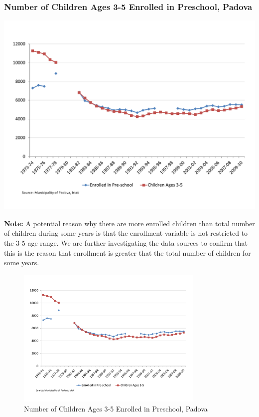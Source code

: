 \documentclass[static]{JJH-Beamer_PAGENOS}
\begin{document}
\begin{frame}
\frametitle{Number of Children Ages 3-5 Enrolled in Preschool, Padova}
\begin{center}
\includegraphics[scale=0.36]{../../output/image/Enrollement_Preschool_Padova.pdf}
\end{center}
\tiny{\textbf{Note:} A potential reason why there are more enrolled children than total number of children during some years is that the enrollment variable is not restricted to the 3-5 age range. We are further investigating the data sources to confirm that this is the reason that enrollment is greater that the total number of children for some years.}
 
\centering
\begin{figure}[H]
\caption{Number of Children Ages 3-5 Enrolled in Preschool, Padova}
\includegraphics[width=0.8\textwidth]{../../output/image/Enrollement_Preschool_Padova.pdf}
\end{figure}

\end{frame}
\end{document}
